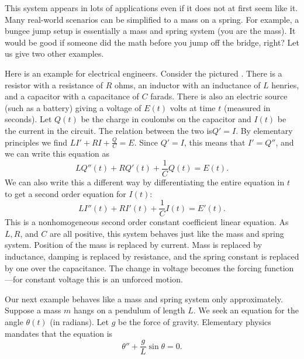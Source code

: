 \documentclass{ximera}
\begin{document}
This system appears in lots of applications even if it does not at first seem like it.  Many real-world scenarios can be simplified to a mass on a spring.  For example, a bungee jump setup is essentially a mass and spring system (you are the mass).  It would be good if someone did the math before you jump off the bridge, right?  Let us give two other examples.


\begin{mywrapfigsimp}[5]{1.35in}{1.65in}
    \noindent
    
\end{mywrapfigsimp}
Here is an example for electrical engineers. Consider the pictured . There is a resistor with a resistance of $R$ ohms, an inductor with an inductance of $L$ henries, and a capacitor with a capacitance of $C$ farads.  There is also an electric source (such as a battery) giving a voltage of $E(t)$ volts at time $t$ (measured in seconds). Let $Q(t)$ be the charge in coulombs on the capacitor and $I(t)$ be the current in the circuit.  The relation between the two is$Q' = I$.  By elementary principles we find $L I' + RI + \frac{Q}{C} = E$. Since $Q' = I$, this means that $I' = Q''$, and we can write this equation as
\begin{equation*}
    LQ''(t) + RQ'(t) + \frac{1}{C}Q(t) = E(t).
\end{equation*}   
We can also write this a different way by differentiating the entire equation in $t$ to get a second order equation for $I(t)$: 
\begin{equation*}
    L I''(t) + R I'(t) + \frac{1}{C} I(t) = E'(t) .
\end{equation*}
This is a nonhomogeneous second order constant coefficient linear equation. As $L, R$, and $C$ are all positive, this system behaves just like the mass and spring system.  Position of the mass is replaced by current. Mass is replaced by inductance, damping is replaced by resistance, and the spring constant is replaced by one over the capacitance.  The change in voltage becomes the forcing function---for constant voltage this is an unforced motion.


\begin{mywrapfigsimp}[10]{1.8in}{2.16in}
    \noindent
    
\end{mywrapfigsimp}
Our next example behaves like a mass and spring system only approximately. Suppose a mass $m$ hangs on a pendulum of length $L$.  We seek an equation for the angle $\theta(t)$ (in radians).  Let $g$ be the force of gravity. Elementary physics mandates that the equation is
\begin{equation*}
    \theta'' + \frac{g}{L} \sin \theta = 0 .
\end{equation*}
\end{document}

